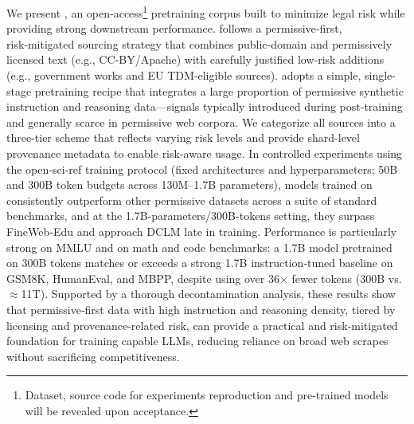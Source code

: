 
We present \MixtureVitae{}, an open‑access\footnote{Dataset, source code for experiments reproduction and pre-trained models will be revealed upon acceptance.} pretraining corpus built to minimize legal risk while providing strong downstream performance.  \MixtureVitae{} follows a permissive‑first, risk‑mitigated sourcing strategy that combines public‑domain and permissively licensed text (e.g., CC‑BY/Apache) with carefully justified low‑risk additions (e.g., government works and EU TDM‑eligible sources). \MixtureVitae{} adopts a simple, single-stage pretraining recipe that integrates a large proportion of permissive synthetic instruction and reasoning data—signals typically introduced during post-training and generally scarce in permissive web corpora. We categorize all sources into a three-tier scheme that reflects varying risk levels and provide shard-level provenance metadata to enable risk-aware usage. In controlled experiments using the open‑sci‑ref training protocol (fixed architectures and hyperparameters; 50B and 300B token budgets across 130M–1.7B parameters), models trained on \MixtureVitae{} consistently outperform other permissive datasets across a suite of standard benchmarks, and at the 1.7B-parameters/300B-tokens setting, they surpass FineWeb‑Edu and approach DCLM late in training. Performance is particularly strong on MMLU and on math and code benchmarks: a 1.7B model pretrained on 300B \MixtureVitae{} tokens matches or exceeds a strong 1.7B instruction‑tuned baseline on GSM8K, HumanEval, and MBPP, despite using over 36$\times$ fewer tokens (300B vs.\ $\approx$11T). Supported by a thorough decontamination analysis, these results show that permissive‑first data with high instruction and reasoning density, tiered by licensing and provenance-related risk, can provide a practical and risk-mitigated foundation for training capable LLMs, reducing reliance on broad web scrapes without sacrificing competitiveness.



